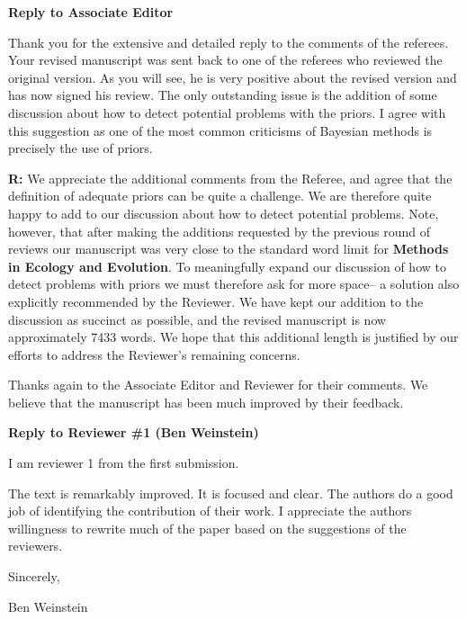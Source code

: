 \documentclass[12pt]{letter}
\newenvironment{refquote}{\bigskip \begin{it}}{\end{it}\smallskip}
\begin{document}
\newpage

\setcounter{page}{1}


{\Large \bf Reply to Associate Editor}


	\begin{refquote}
		
		Thank you for the extensive and detailed reply to the comments of the referees. Your revised manuscript was sent back to one of the referees who reviewed the original version. As you will see, he is very positive about the revised version and has now signed his review. The only outstanding issue is the addition of some discussion about how to detect potential problems with the priors. I agree with this suggestion as one of the most common criticisms of Bayesian methods is precisely the use of priors.

	\end{refquote}


	\textbf{R:} We appreciate the additional comments from the Referee, and agree that the definition of adequate priors can be quite a challenge. We are therefore quite happy to add to our discussion about how to detect potential problems. Note, however, that after making the additions requested by the previous round of reviews our manuscript was very close to the standard word limit for \textbf{Methods in Ecology and Evolution}. To meaningfully expand our discussion of how to detect problems with priors we must therefore ask for more space-- a solution also explicitly recommended by the Reviewer. We have kept our addition to the discussion as succinct as possible, and the revised manuscript is now approximately 7433 words. We hope that this additional length is justified by our efforts to address the Reviewer's remaining concerns.


	Thanks again to the Associate Editor and Reviewer for their comments. We believe that the manuscript has been much improved by their feedback.


\newpage


{\Large \bf Reply to Reviewer \#1 (Ben Weinstein)}

	\begin{refquote}

		I am reviewer 1 from the first submission. 

		The text is remarkably improved. It is focused and clear. The authors do a good job of identifying the contribution of their work. I appreciate the authors willingness to rewrite much of the paper based on the suggestions of the reviewers. 


		Sincerely, 

		Ben Weinstein

	\end{refquote}
\end{document}
